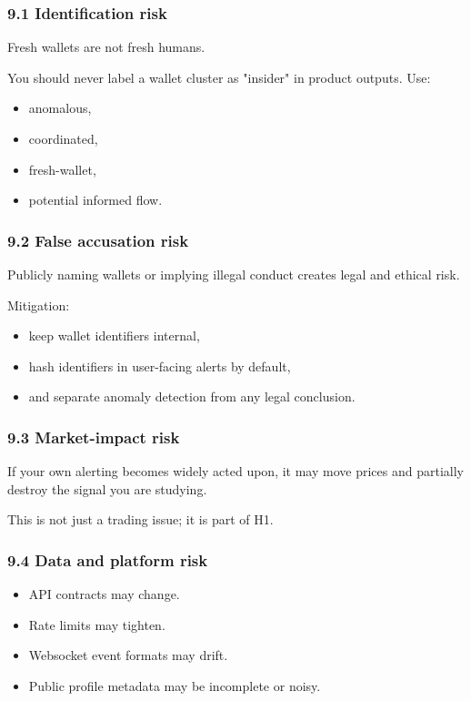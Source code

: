 \documentclass[
]{article}
\providecommand{\tightlist}{%
  \setlength{\itemsep}{0pt}\setlength{\parskip}{0pt}}
\begin{document}
\subsubsection{9.1 Identification risk}\label{91-identification-risk}

Fresh wallets are not fresh humans.

You should never label a wallet cluster as "insider" in product outputs.
Use:

\begin{itemize}
\tightlist
\item
  anomalous,
\item
  coordinated,
\item
  fresh-wallet,
\item
  potential informed flow.
\end{itemize}

\subsubsection{9.2 False accusation
risk}\label{92-false-accusation-risk}

Publicly naming wallets or implying illegal conduct creates legal and
ethical risk.

Mitigation:

\begin{itemize}
\tightlist
\item
  keep wallet identifiers internal,
\item
  hash identifiers in user-facing alerts by default,
\item
  and separate anomaly detection from any legal conclusion.
\end{itemize}

\subsubsection{9.3 Market-impact risk}\label{93-market-impact-risk}

If your own alerting becomes widely acted upon, it may move prices and
partially destroy the signal you are studying.

This is not just a trading issue; it is part of H1.

\subsubsection{9.4 Data and platform
risk}\label{94-data-and-platform-risk}

\begin{itemize}
\tightlist
\item
  API contracts may change.
\item
  Rate limits may tighten.
\item
  Websocket event formats may drift.
\item
  Public profile metadata may be incomplete or noisy.
\end{itemize}
\end{document}
